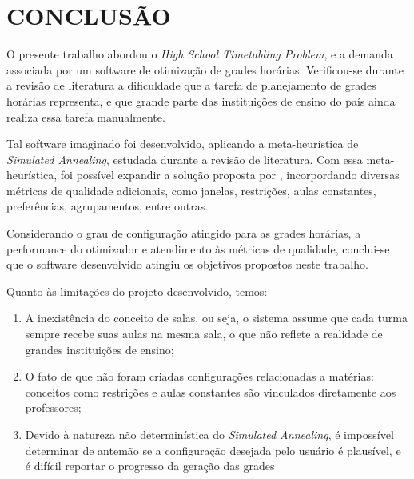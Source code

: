 
\chapter{CONCLUSÃO}
\label{chap:conclusao}

O presente trabalho abordou o \textit{High School Timetabling Problem}, e a demanda associada por um software de otimização de grades horárias. Verificou-se durante a revisão de literatura a dificuldade que a tarefa de planejamento de grades horárias representa, e que grande parte das instituições de ensino do país ainda realiza essa tarefa manualmente.

Tal software imaginado foi desenvolvido, aplicando a meta-heurística de \textit{Simulated Annealing}, estudada durante a revisão de literatura. Com essa meta-heurística, foi possível expandir a solução proposta por , incorpordando diversas métricas de qualidade adicionais, como janelas, restrições, aulas constantes, preferências, agrupamentos, entre outras.

Considerando o grau de configuração atingido para as grades horárias, a performance do otimizador e atendimento às métricas de qualidade, conclui-se que o software desenvolvido atingiu os objetivos propostos neste trabalho.

Quanto às limitações do projeto desenvolvido, temos:
\begin{enumerate}
	\item A inexistência do conceito de salas, ou seja, o sistema assume que cada turma sempre recebe suas aulas na mesma sala, o que não reflete a realidade de grandes instituições de ensino;
	\item O fato de que não foram criadas configurações relacionadas a matérias: conceitos como restrições e aulas constantes são vinculados diretamente aos professores;
	\item Devido à natureza não determinística do \textit{Simulated Annealing}, é impossível determinar de antemão se a configuração desejada pelo usuário é plausível, e é difícil reportar o progresso da geração das grades
\end{enumerate}